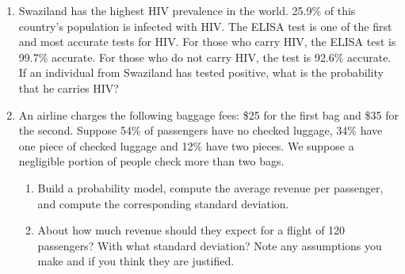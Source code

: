 \documentclass{article}\usepackage[]{graphicx}\usepackage[]{color}
\begin{document}
\begin{enumerate}
\item Swaziland has the highest HIV prevalence in the world. 25.9\% of this country's population is infected with HIV. The ELISA test is one of the first and most accurate tests for HIV. For those who carry HIV, the ELISA test is 99.7\% accurate. For those who do not carry HIV, the test is 92.6\% accurate. If an individual from Swaziland has tested positive, what is the probability that he carries HIV?
% 
% 

\item An airline charges the following baggage fees: \$25 for the first bag and \$35 for the second. Suppose 54\% of passengers have no checked luggage, 34\% have one piece of checked luggage and 12\% have two pieces. We suppose a negligible portion of people check more than two bags.
\begin{enumerate}
\item Build a probability model, compute the average revenue per passenger, and compute the corresponding standard deviation.
\item About how much revenue should they expect for a flight of 120 passengers? With what standard deviation? Note any assumptions you make and if you think they are justified.
\end{enumerate}


\end{enumerate}
\end{document}
